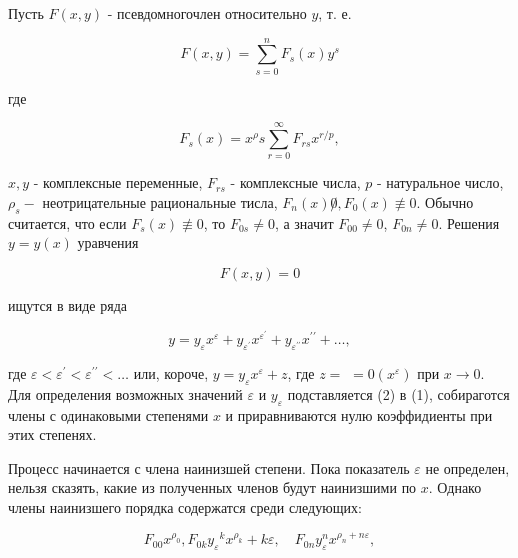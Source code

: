 \documentclass[10pt]{article}
\begin{document}
Пусть $F(x, y)$ - псевдомногочлен относительно $y$, т. е.



\[

F(x, y)=\sum_{s=0}^{n} F_{s}(x) y^{s}

\]



где



\[

F_{s}(x)=x^{\rho} s \sum_{r=0}^{\infty} F_{r s} x^{r / p},

\]



$x, y$ - комплексные переменные, $F_{r s}$ - комплексные числа, $p$ - натуральное число, $\rho_{s}-$ неотрицательные рациональные тисла, $F_{n}(x) \not 0, F_{0}(x) \not \equiv 0$. Обычно считается, что если $F_{s}(x) \not \equiv 0$, то $F_{0 s} \neq 0$, а значит $F_{00} \neq 0$, $F_{0 n} \neq 0$. Решения $y=y(x)$ уравчения



\[

F(x, y)=0

\]



ищутся в виде ряда



\[

y=y_{\varepsilon} x^{\varepsilon}+y_{\varepsilon^{\prime}} x^{\varepsilon^{\prime}}+y_{\varepsilon^{\prime \prime}} x^{\prime \prime}+\ldots,

\]



где $\varepsilon<\varepsilon^{\prime}<\varepsilon^{\prime \prime}<\ldots$ или, короче, $y=y_{\varepsilon} x^{\varepsilon}+z$, где $z=$ $=0\left(x^{\varepsilon}\right)$ при $x \rightarrow 0$. Для определения возможных значений $\varepsilon$ и $y_{\varepsilon}$ подставляется (2) в (1), собираготся члены с одинаковыми степенями $x$ и приравниваются нулю коэффидиенты при этих степенях.



Процесс начинается с члена наинизшей степени. Пока показатель $\varepsilon$ не определен, нельзя сказять, какие из полученных членов будут наинизшими по $x$. Однако члены наинизшего порядка содержатся среди следующих:



\[

F_{00} x^{\rho_{0}}, F_{0 k} y_{\varepsilon}{ }^{k} x^{\rho_{k}}+k \varepsilon, \quad F_{0 n} y_{\varepsilon}^{n} x^{\rho_{n}+n \varepsilon},

\]
\end{document}
